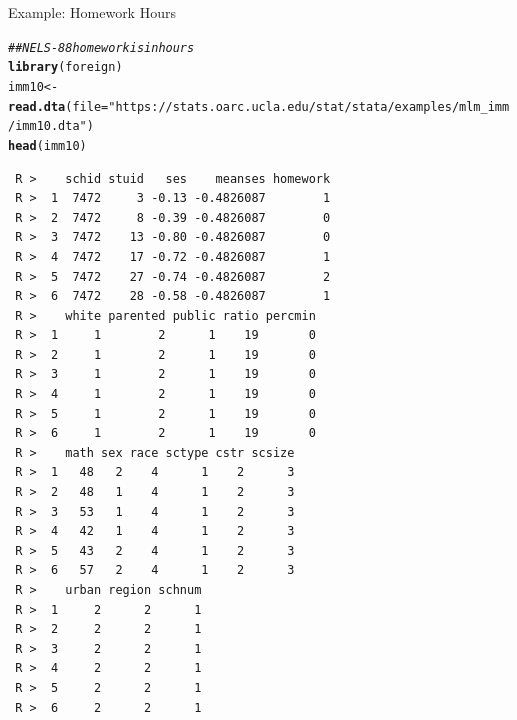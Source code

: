 \documentclass[10pt]{beamer}\usepackage[]{graphicx}\usepackage[]{xcolor}
\makeatletter
\newcommand{\hlstr}[1]{\textcolor[rgb]{0.192,0.494,0.8}{#1}}%
\newcommand{\hlcom}[1]{\textcolor[rgb]{0.678,0.584,0.686}{\textit{#1}}}%
\newcommand{\hlstd}[1]{\textcolor[rgb]{0.345,0.345,0.345}{#1}}%
\newcommand{\hlkwb}[1]{\textcolor[rgb]{0.69,0.353,0.396}{#1}}%
\newcommand{\hlkwc}[1]{\textcolor[rgb]{0.333,0.667,0.333}{#1}}%
\newcommand{\hlkwd}[1]{\textcolor[rgb]{0.737,0.353,0.396}{\textbf{#1}}}%
\newenvironment{kframe}{%
 \def\at@end@of@kframe{}%
 \ifinner\ifhmode%
  \def\at@end@of@kframe{\end{minipage}}%
  \begin{minipage}{\columnwidth}%
 \fi\fi%
 \def\FrameCommand##1{\hskip\@totalleftmargin \hskip-\fboxsep
 \colorbox{shadecolor}{##1}\hskip-\fboxsep
     \hskip-\linewidth \hskip-\@totalleftmargin \hskip\columnwidth}%
 \MakeFramed {\advance\hsize-\width
   \@totalleftmargin\z@ \linewidth\hsize
   \@setminipage}}%
 {\par\unskip\endMakeFramed%
 \at@end@of@kframe}
\newenvironment{knitrout}{}{} %
\makeatother
\begin{document}
\begin{frame}[containsverbatim]{Example: Homework Hours}
\tiny
\begin{knitrout}
\color{fgcolor}\begin{kframe}
\begin{alltt}
\hlcom{## NELS-88 homework is in hours}
\hlkwd{library}\hlstd{(foreign)}
\hlstd{imm10} \hlkwb{<-} \hlkwd{read.dta}\hlstd{(}\hlkwc{file} \hlstd{=} \hlstr{"https://stats.oarc.ucla.edu/stat/stata/examples/mlm_imm/imm10.dta"}\hlstd{)}
\hlkwd{head}\hlstd{(imm10)}
\end{alltt}
\begin{verbatim}
 R >    schid stuid   ses    meanses homework
 R >  1  7472     3 -0.13 -0.4826087        1
 R >  2  7472     8 -0.39 -0.4826087        0
 R >  3  7472    13 -0.80 -0.4826087        0
 R >  4  7472    17 -0.72 -0.4826087        1
 R >  5  7472    27 -0.74 -0.4826087        2
 R >  6  7472    28 -0.58 -0.4826087        1
 R >    white parented public ratio percmin
 R >  1     1        2      1    19       0
 R >  2     1        2      1    19       0
 R >  3     1        2      1    19       0
 R >  4     1        2      1    19       0
 R >  5     1        2      1    19       0
 R >  6     1        2      1    19       0
 R >    math sex race sctype cstr scsize
 R >  1   48   2    4      1    2      3
 R >  2   48   1    4      1    2      3
 R >  3   53   1    4      1    2      3
 R >  4   42   1    4      1    2      3
 R >  5   43   2    4      1    2      3
 R >  6   57   2    4      1    2      3
 R >    urban region schnum
 R >  1     2      2      1
 R >  2     2      2      1
 R >  3     2      2      1
 R >  4     2      2      1
 R >  5     2      2      1
 R >  6     2      2      1
\end{verbatim}
\end{kframe}
\end{knitrout}
\end{frame}
\end{document}
